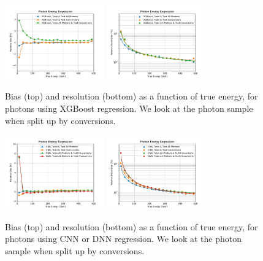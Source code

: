 \begin{figure}[htbp]
\centering
\includegraphics[width=0.38\textwidth]{Images/Calo/bias_vs_E_GammaFixed_xgb_convs.pdf}
\includegraphics[width=0.38\textwidth]{Images/Calo/res_vs_E_GammaFixed_xgb_convs_fits.pdf}
\caption{Bias (top) and resolution (bottom) as a function of true energy, for photons using XGBoost regression.  We look at the photon sample when split up by conversions.
}
\label{fig:reg_xgb_conv_gamma}
\end{figure}

\begin{figure}[htbp]
\centering
\includegraphics[width=0.38\textwidth]{Images/Calo/bias_vs_E_GammaFixed_nn_convs.pdf}
\includegraphics[width=0.38\textwidth]{Images/Calo/res_vs_E_GammaFixed_nn_convs_fits.pdf}
\caption{Bias (top) and resolution (bottom) as a function of true energy, for photons using CNN or DNN regression.  We look at the photon sample when split up by conversions.
}
\label{fig:reg_nn_conv_gamma}
\end{figure}
